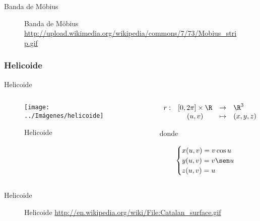 \documentclass[10pt]{beamer}
\begin{document}
	\begin{frame}{Banda de Möbius}
	\begin{figure}
		\centering
		\caption{Banda de Möbius \url{http://upload.wikimedia.org/wikipedia/commons/7/73/Mobius_strip.gif}}
		\label{fig:banda-de-Moebius-gif}
	\end{figure}
		
	\end{frame}
	
	\subsubsection{Helicoide}
	
	\begin{frame}{Helicoide}
		\begin{columns}[t] %
			\begin{column}{.50\textwidth}
				\begin{figure}
					\centering
					\texttt{[image: ../Imágenes/helicoide]}
					\caption{Helicoide}
					\label{fig:helicoide}
				\end{figure}
			\end{column}%
			\hfill%
			\begin{column}{.50\textwidth}
				$$\begin{array}{rcll}
				r : & [0, 2\pi] \times \R & \to & \R^3\\
				& (u,v) & \mapsto & (x,y,z)
				\end{array}$$
				
				donde 
				
				$$ \begin{cases}
				x(u,v) = v\cos u \\
				y(u,v) = v\sen u \\
				z(u,v) = u
				\end{cases} $$
			\end{column}%
		\end{columns}
	\end{frame}
	
	\begin{frame}{Helicoide}
	\begin{figure}
		\centering
		\caption{Helicoide \url{http://en.wikipedia.org/wiki/File:Catalan_surface.gif}}
		\label{fig:helicoide-gif}
	\end{figure}
		
	\end{frame}
	
\end{document}
